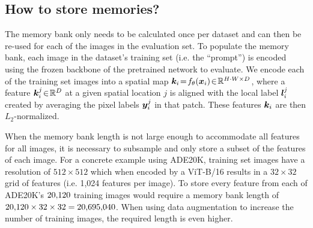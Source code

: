 \documentclass{article}
\begin{document}
\subsection{How to store memories?}
\label{sec:app-mem}
The memory bank only needs to be calculated once per dataset and can then be re-used for each of the images in the evaluation set. To populate the memory bank, each image in the dataset's training set (i.e. the ``prompt'') is encoded using the frozen backbone of the pretrained network to evaluate. We encode each of the training set images into a spatial map ${\bm{k}}_i \!=\! f_\theta({\bm{x}}_i) \!\in\! \mathbb{R}^{H \cdot W \times D}$, where a feature ${\bm{k}}_i^j \!\in\! \mathbb{R}^D$ at a given spatial location $j$ is aligned with the local label ${\bm{l}}_i^j$ created by averaging the pixel labels ${\bm{y}}_i^j$ in that patch. These features ${\bm{k}}_i$ are then $L_2$-normalized.

When the memory bank length is not large enough to accommodate all features for all images, it is necessary to subsample and only store a subset of the features of each image. For a concrete example using  ADE20K, training set images have a resolution of \(512 \times 512\) which when encoded by a ViT-B/16 results in a \(32 \times 32\) grid of features (i.e. 1,024 features per image). To store every feature from each of ADE20K's \(20{\small,}120\) training images would require a memory bank length of \(20{\small,}120 \times 32 \times 32 = 20{\small,}695{\small,}040\). When using data augmentation to increase the number of training images, the required length is even higher.
\end{document}
